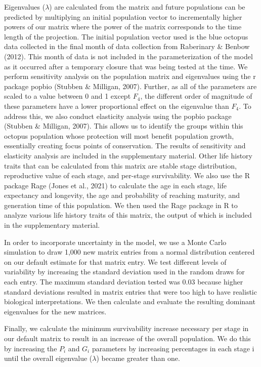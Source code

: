 \documentclass[
]{article}
\begin{document}
Eigenvalues (\(\lambda\)) are calculated from the matrix and future populations can be predicted by multiplying an initial population vector to incrementally higher powers of our matrix where the power of the matrix corresponds to the time length of the projection. The initial population vector used is the blue octopus data collected in the final month of data collection from Raberinary \& Benbow (2012). This month of data is not included in the parameterization of the model as it occurred after a temporary closure that was being tested at the time. We perform sensitivity analysis on the population matrix and eigenvalues using the r package popbio (Stubben \& Milligan, 2007). Further, as all of the parameters are scaled to a value between 0 and 1 except \(F_4\), the different order of magnitude of these parameters have a lower proportional effect on the eigenvalue than \(F_4\). To address this, we also conduct elasticity analysis using the popbio package (Stubben \& Milligan, 2007). This allows us to identify the groups within this octopus population whose protection will most benefit population growth, essentially creating focus points of conservation. The results of sensitivity and elasticity analysis are included in the supplementary material. Other life history traits that can be calculated from this matrix are stable stage distribution, reproductive value of each stage, and per-stage survivability. We also use the R package Rage (Jones et al., 2021) to calculate the age in each stage, life expectancy and longevity, the age and probability of reaching maturity, and generation time of this population. We then used the Rage package in R to analyze various life history traits of this matrix, the output of which is included in the supplementary material.

In order to incorporate uncertainty in the model, we use a Monte Carlo simulation to draw 1,000 new matrix entries from a normal distribution centered on our default estimate for that matrix entry. We test different levels of variability by increasing the standard deviation used in the random draws for each entry. The maximum standard deviation tested was 0.03 because higher standard deviations resulted in matrix entries that were too high to have realistic biological interpretations. We then calculate and evaluate the resulting dominant eigenvalues for the new matrices.

Finally, we calculate the minimum survivability increase necessary per stage in our default matrix to result in an increase of the overall population. We do this by increasing the \(P_i\) and \(G_i\) parameters by increasing percentages in each stage i until the overall eigenvalue (\(\lambda\)) became greater than one.
\end{document}
